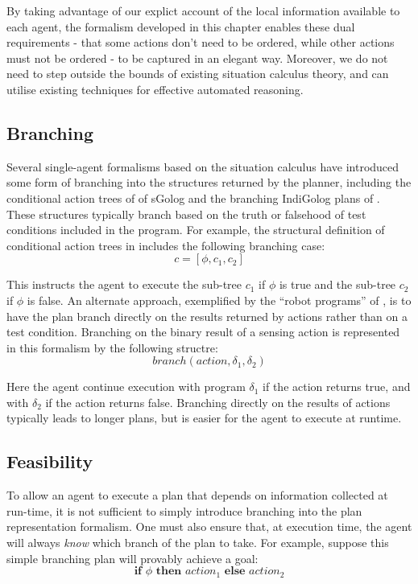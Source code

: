 By taking advantage of our explict account of the local information
available to each agent, the formalism developed in this chapter enables
these dual requirements - that some actions don't need to be ordered,
while other actions must not be ordered - to be captured in an elegant
way. Moreover, we do not need to step outside the bounds of existing
situation calculus theory, and can utilise existing techniques for
effective automated reasoning.


\subsection{Branching}

Several single-agent formalisms based on the situation calculus have
introduced some form of branching into the structures returned by
the planner, including the conditional action trees of of sGolog \citep{lakemeyer99golog_cats}
and the branching IndiGolog plans of \citep{giacomo04sem_delib_indigolog}.
These structures typically branch based on the truth or falsehood
of test conditions included in the program. For example, the structural
definition of conditional action trees in \citep{lakemeyer99golog_cats}
includes the following branching case:\[
c=[\phi,c_{1},c_{2}]\]


This instructs the agent to execute the sub-tree $c_{1}$ if $\phi$
is true and the sub-tree $c_{2}$ if $\phi$ is false. An alternate
approach, exemplified by the {}``robot programs'' of \citep{levesque98what_robots_can_do},
is to have the plan branch directly on the results returned by actions
rather than on a test condition. Branching on the binary result of
a sensing action is represented in this formalism by the following
structre:\[
branch(action,\delta_{1},\delta_{2})\]


Here the agent continue execution with program $\delta_{1}$ if the
action returns true, and with $\delta_{2}$ if the action returns
false. Branching directly on the results of actions typically leads
to longer plans, but is easier for the agent to execute at runtime.


\subsection{Feasibility\label{sec:JointExec:BG:Feasibility}}

To allow an agent to execute a plan that depends on information collected
at run-time, it is not sufficient to simply introduce branching into
the plan representation formalism. One must also ensure that, at execution
time, the agent will always \emph{know} which branch of the plan to
take. For example, suppose this simple branching plan will provably
achieve a goal:\[
\mathbf{if}\,\,\phi\,\,\mathbf{then}\,\, action_{1}\,\,\mathbf{else\,}\, action_{2}\]


